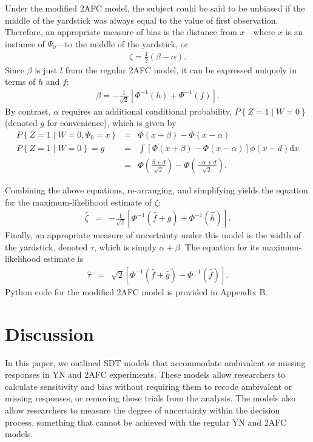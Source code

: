 \documentclass[man]{apa6}
\begin{document}
Under the modified 2AFC model, the subject could be said to be unbiased if the middle of the yardstick was always equal to the value of first observation. Therefore, an appropriate measure of bias is the distance from $x$---where $x$ is an instance of $\Psi_0$---to the middle of the yardstick, or
\begin{eqnarray*}
\zeta=\frac{1}{2}\left(\beta-\alpha\right)\textrm{.}
\end{eqnarray*}
Since $\beta$ is just $l$ from the regular 2AFC model, it can be expressed uniquely in terms of $h$ and $f$:
\begin{eqnarray*}
\beta=-\frac{1}{\sqrt{2}}\left[\Phi^{-1}\left(h\right)+\Phi^{-1}\left(f\right)\right]\textrm{.}
\end{eqnarray*}
By contrast, $\alpha$ requires an additional conditional probability, $P\left\{Z=1\mid{}W=0\right\}$ (denoted $g$ for convenience), which is given by
\begin{eqnarray*}
P\left\{Z=1\mid{}W=0,\Psi_0=x\right\}&=&\Phi\left(x+\beta\right)-\Phi\left(x-\alpha\right)\\
P\left\{Z=1\mid{}W=0\right\}=g&=&\int\!\left[\Phi\left(x+\beta\right)-\Phi\left(x-\alpha\right)\right]\phi\left(x-d\right)\textrm{d}x\\
&=&\Phi\left(\frac{\beta+d}{\sqrt{2}}\right)-\Phi\left(\frac{-\alpha+d}{\sqrt{2}}\right)\textrm{.}
\end{eqnarray*}


Combining the above equations, re-arranging, and simplifying yields the equation for the maximum-likelihood estimate of $\zeta$:
\begin{eqnarray}
\hat{\zeta}&=&-\frac{1}{\sqrt{2}}\left[\Phi^{-1}\left(\hat{f}+\hat{g}\right)+\Phi^{-1}\left(\hat{h}\right)\right]\textrm{.}
\end{eqnarray}
Finally, an appropriate measure of uncertainty under this model is the width of the yardstick, denoted $\tau$, which is simply $\alpha+\beta$. The equation for its maximum-likelihood estimate is
\begin{eqnarray}
\hat{\tau}&=&\sqrt{2}\left[\Phi^{-1}\left(\hat{f}+\hat{g}\right)-\Phi^{-1}\left(\hat{f}\right)\right]\textrm{.}
\end{eqnarray}Python code for the modified 2AFC model is provided in Appendix B.

\section{Discussion}
In this paper, we outlined SDT models that accommodate ambivalent or missing responses in YN and 2AFC experiments. These models allow researchers to calculate sensitivity and bias without requiring them to recode ambivalent or missing responses, or removing those trials from the analysis. The models also allow researchers to measure the degree of uncertainty within the decision process, something that cannot be achieved with the regular YN and 2AFC models.
\end{document}
